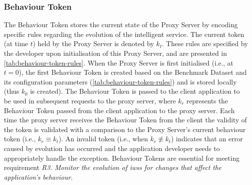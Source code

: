 \subsubsection{Behaviour Token} 
\label{fse2020:sec:components:behaviour-token}
The Behaviour Token stores the current state of the Proxy Server by encoding specific rules regarding the evolution of the intelligent service. The current token (at time $t$) held by the Proxy Server is denoted by $k_{t}$. These rules are specified by the developer upon initialisation of this Proxy Server, and are presented in \cref{tab:behaviour-token-rules}. When the Proxy Server is first initialised (i.e., at $t = 0$), the first Behaviour Token is created based on the Benchmark Dataset and its configuration parameters (\cref{tab:behaviour-token-rules}) and is stored locally (thus $k_{0}$ is created). The Behaviour Token is passed to the client application to be used in subsequent requests to the proxy server, where $k_{r}$ represents the Behaviour Token passed from the client application to the proxy server. Each time the proxy server receives the Behaviour Token from the client the validity of the token is validated with a comparison to the Proxy Server's current behaviour token (i.e., $k_{r} \equiv k_{t}$). An invalid token (i.e., when $k_{r} \not\equiv k_{t}$)  indicates that an error caused by evolution has occurred and the application developer needs to appropriately handle the exception. Behaviour Tokens are essential for meeting requirement \textit{R3. Monitor the evolution of \glspl{iws} for changes that affect the application’s behaviour.}   


